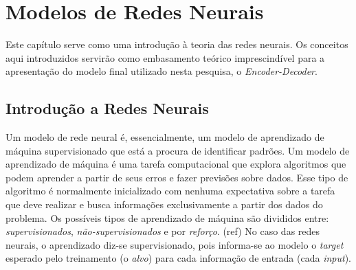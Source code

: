 \chapter{Modelos de Redes Neurais}
\label{ch:03}



Este capítulo serve como uma introdução à teoria das redes neurais. Os conceitos aqui introduzidos servirão como embasamento teórico imprescindível para a apresentação do modelo final utilizado nesta pesquisa, o \textit{Encoder-Decoder}. 

\section{Introdução a Redes Neurais}

Um modelo de rede neural é, essencialmente, um modelo de aprendizado de máquina supervisionado %
que está a procura de identificar padrões. Um modelo de aprendizado de máquina é uma tarefa computacional que explora algoritmos que podem aprender a partir de seus erros e fazer previsões sobre dados. Esse tipo de algoritmo é normalmente inicializado com nenhuma expectativa sobre a tarefa que deve realizar e busca informações exclusivamente a partir dos dados do problema. Os possíveis tipos de aprendizado de máquina são divididos entre: \textit{supervisionados}, \textit{não-supervisionados}
e por \textit{reforço}. (ref)
No caso das redes neurais, o aprendizado diz-se supervisionado, pois informa-se ao modelo o \textit{target} esperado  pelo treinamento (o \textit{alvo}) para cada informação de entrada (cada \textit{input}).

